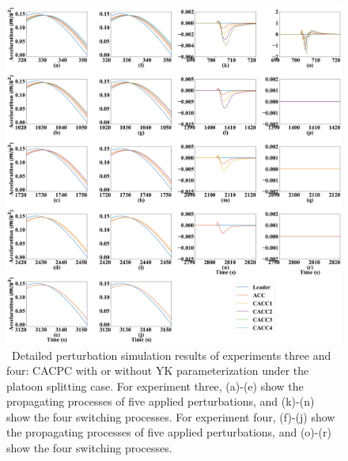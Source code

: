 \documentclass[trsc,nonblindrev]{informs3} %
\begin{document}
\begin{figure}
    \centering
    \includegraphics[width=14cm]{figs/split_detail.png}
    \caption{~Detailed perturbation simulation results of experiments three and four: CACPC with or without YK parameterization under the platoon splitting case. For experiment three, (a)-(e) show the propagating processes of five applied perturbations, and (k)-(n) show the four switching processes. For experiment four, (f)-(j) show the propagating processes of five applied perturbations, and (o)-(r) show the four switching processes.}
    \label{new4}
\end{figure}



\end{document}
